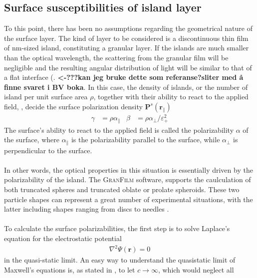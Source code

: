 \subsection{Surface susceptibilities of island layer}
To this point, there has been no assumptions regarding the geometrical nature of the surface layer.
The kind of layer to be considered is a discontinuous thin film of nm-sized island, constituting
a granular layer. If the islands are much smaller than the optical wavelength, the 
scattering from the granular film will be negligible and the resulting angular distribution 
of light will be similar to that of a flat interface 
(\cite[p.11]{LieL2010}. \textbf{<-???kan jeg bruke dette som referanse?sliter med å finne svaret i BV boka}.
In this case, the density of islands, or the number of island per unit surface area $\rho$, together with 
their ability to react to the applied field, ,
decide the surface polarization density $\boldsymbol{P}^s(\boldsymbol{r}_{\parallel})$ 
\cite[p.~99]{BedeauxVliegerBook}
\begin{align}
   \gamma &= \rho \alpha_{\parallel}         &\beta &= \rho \alpha_{\perp}/\varepsilon_+^2
   \label{susceptibilityPolarizability}
\end{align}
The surface's ability to react to the applied field is called the polarizability $\alpha$ of the surface,
where $\alpha_{\parallel}$ is the polarizability parallel to the surface, while $\alpha_{\perp}$
is perpendicular to the surface. %
\\
\\
In other words, the optical properties in this situation is essentially driven by the polarizability
of the island. The \textsc{GranFilm} software, supports the caulculation of both truncated spheres 
and truncated oblate or prolate spheroids. These two particle shapes can represent a great 
number of experimental situations, with the latter including shapes ranging from discs to needles
\cite[p.~128]{Lazzari2002}.
\\
\\
To calculate the surface polarizabilities, the first step is to solve Laplace's equation for the
electrostatic potential
\begin{align}
   \nabla^2 \Psi(\boldsymbol{r}) = 0
   \label{laplaceEq}
\end{align}
in the quasi-static limit. An easy way to understand the quasistatic limit of Maxwell's equations is,
as stated in \cite[p.~238]{Larsson2007}, to let $c \rightarrow \infty$, which would neglect all 

